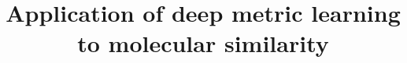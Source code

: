 \documentclass[doublespacing]{bmcart}
\begin{document}
\begin{frontmatter}

\begin{fmbox}


\title{Application of deep metric learning to molecular  similarity}


\author[
  addressref={aff1},                   %
  corref={aff1},                       %
  email={damien.x.coupry@gsk.com}   %
]{ }

\author[
  addressref={aff1},
]{ }




\address[id=aff1]{%
  ,             %
  ,          %
  ,                              %
}




\end{fmbox}
\end{frontmatter}
\end{document}
